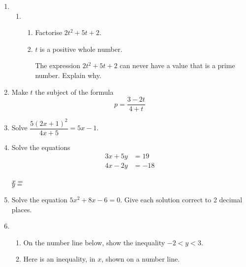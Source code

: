 \begin{enumerate}
  \newpage
  \item %
  \begin{enumerate}
    \item %
    \begin{enumerate}
      \item Factorise $2t^2 + 5t + 2$.\strch
      \item $t$ is a positive whole number.\par
      The expression $2t^2 + 5t + 2$ can never have a value that is a prime number. Explain why.\strch
    \end{enumerate}
  \end{enumerate}
  \item Make $t$ the subject of the formula $$p = \frac{3-2t}{4 + t}$$\strch
  \item Solve $\dfrac{5(2x + 1)^2}{4x + 5} = 5x - 1$.\strch
  \item Solve the equations
  \begin{align*}
    3x + 5y &= 19\\
    4x - 2y &= -18
  \end{align*}
  \strch\\
  \vspace*{0pt}\hfill$x =\ $\dline\\
  \vspace*{0pt}\hfill$y =\ $\dline
  \item Solve the equation 	$5x^2 + 8x - 6 = 0$. Give each solution correct to 2 decimal places.\strch
  \newpage
  \item %
  \begin{enumerate}
    \item On the number line below, show the inequality $-2 < y < 3$.
    \begin{figure}[H]
      \centering
    \end{figure}\strch
    \item Here is an inequality, in $x$, shown on a number line.
    \begin{figure}[H]
      \centering
\end{figure}
\end{enumerate}
\end{enumerate}
